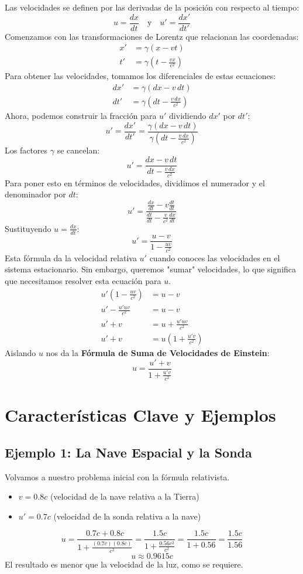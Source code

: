 \documentclass[11pt,a4paper]{article}
\begin{document}
Las velocidades se definen por las derivadas de la posición con respecto al tiempo:
\[ u = \frac{dx}{dt} \quad \text{y} \quad u' = \frac{dx'}{dt'} \]
Comenzamos con las transformaciones de Lorentz que relacionan las coordenadas:
\begin{align*}
x' &= \gamma(x - vt) \\
t' &= \gamma\left(t - \frac{vx}{c^2}\right)
\end{align*}
Para obtener las velocidades, tomamos los diferenciales de estas ecuaciones:
\begin{align*}
dx' &= \gamma(dx - v\,dt) \\
dt' &= \gamma\left(dt - \frac{v\,dx}{c^2}\right)
\end{align*}
Ahora, podemos construir la fracción para $u'$ dividiendo $dx'$ por $dt'$:
\[ u' = \frac{dx'}{dt'} = \frac{\gamma(dx - v\,dt)}{\gamma\left(dt - \frac{v\,dx}{c^2}\right)} \]
Los factores $\gamma$ se cancelan:
\[ u' = \frac{dx - v\,dt}{dt - \frac{v\,dx}{c^2}} \]
Para poner esto en términos de velocidades, dividimos el numerador y el denominador por $dt$:
\[ u' = \frac{\frac{dx}{dt} - v\frac{dt}{dt}}{\frac{dt}{dt} - \frac{v}{c^2}\frac{dx}{dt}} \]
Sustituyendo $u = \frac{dx}{dt}$:
\[ u' = \frac{u - v}{1 - \frac{uv}{c^2}} \]
Esta fórmula da la velocidad relativa $u'$ cuando conoces las velocidades en el sistema estacionario. Sin embargo, queremos "sumar" velocidades, lo que significa que necesitamos resolver esta ecuación para $u$.
\begin{align*}
u'\left(1 - \frac{uv}{c^2}\right) &= u - v \\
u' - \frac{u'uv}{c^2} &= u - v \\
u' + v &= u + \frac{u'uv}{c^2} \\
u' + v &= u\left(1 + \frac{u'v}{c^2}\right)
\end{align*}
Aislando $u$ nos da la \textbf{Fórmula de Suma de Velocidades de Einstein}:
\[
\boxed{
u = \frac{u' + v}{1 + \frac{u'v}{c^2}}
}
\]

\section{Características Clave y Ejemplos}

\subsection{Ejemplo 1: La Nave Espacial y la Sonda}
Volvamos a nuestro problema inicial con la fórmula relativista.
\begin{itemize}
    \item $v = 0.8c$ (velocidad de la nave relativa a la Tierra)
    \item $u' = 0.7c$ (velocidad de la sonda relativa a la nave)
\end{itemize}
\[ u = \frac{0.7c + 0.8c}{1 + \frac{(0.7c)(0.8c)}{c^2}} = \frac{1.5c}{1 + \frac{0.56c^2}{c^2}} = \frac{1.5c}{1 + 0.56} = \frac{1.5c}{1.56} \]
\[ u \approx 0.9615c \]
El resultado es menor que la velocidad de la luz, como se requiere.
\end{document}
